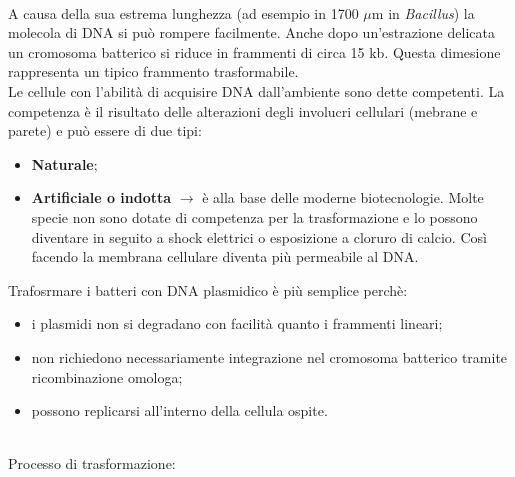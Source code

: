 \\A causa della sua estrema lunghezza (ad esempio in 1700 $\mu$m in \textit{Bacillus}) la molecola di DNA si può rompere facilmente. Anche dopo un'estrazione delicata un cromosoma batterico si riduce in frammenti di circa 15 kb. Questa dimesione rappresenta un tipico frammento trasformabile. 
\\Le cellule con l'abilità di acquisire DNA dall'ambiente sono dette competenti. La competenza è il risultato delle alterazioni degli involucri cellulari (mebrane e parete) e può essere di due tipi:
\begin{itemize}
    \item \textbf{Naturale}; 
    \item \textbf{Artificiale o indotta} $\xrightarrow{}$ è alla base delle moderne biotecnologie. Molte specie non sono dotate di competenza per la trasformazione e lo possono diventare in seguito a shock elettrici o esposizione a cloruro di calcio. Così facendo la membrana cellulare diventa più permeabile al DNA. 
\end{itemize}
Trafosrmare i batteri con DNA plasmidico è più semplice perchè:
\begin{itemize}
    \item i plasmidi non si degradano con facilità quanto i frammenti lineari;
    \item non richiedono necessariamente integrazione nel cromosoma batterico tramite ricombinazione omologa; 
    \item possono replicarsi all'interno della cellula ospite.
\end{itemize}
\\Processo di trasformazione:
